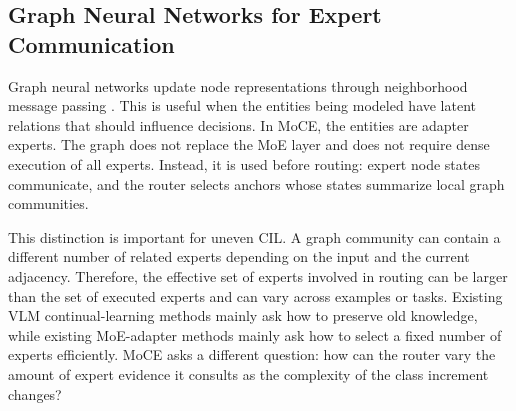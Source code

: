 \documentclass{article}
\theoremstyle{definition}
\theoremstyle{remark}
\begin{document}
\subsection{Graph Neural Networks for Expert Communication}
Graph neural networks update node representations through neighborhood message passing \cite{kipf2017semisupervised,velickovic2018graph}. This is useful when the entities being modeled have latent relations that should influence decisions. In MoCE, the entities are adapter experts. The graph does not replace the MoE layer and does not require dense execution of all experts. Instead, it is used before routing: expert node states communicate, and the router selects anchors whose states summarize local graph communities.

This distinction is important for uneven CIL. A graph community can contain a different number of related experts depending on the input and the current adjacency. Therefore, the effective set of experts involved in routing can be larger than the set of executed experts and can vary across examples or tasks. Existing VLM continual-learning methods mainly ask how to preserve old knowledge, while existing MoE-adapter methods mainly ask how to select a fixed number of experts efficiently. MoCE asks a different question: how can the router vary the amount of expert evidence it consults as the complexity of the class increment changes?

\begin{table}[t]
\centering
\scriptsize
\setlength{\tabcolsep}{2pt}
\caption{Qualitative positioning. Standard MoE adapters execute a fixed number of independent experts. MoCE keeps sparse execution but lets selected anchors communicate with graph neighborhoods, making the number of experts involved in routing flexible under uneven class-incremental complexity.}
\label{tab:qualitative_related_work}
\end{table}
\end{document}
